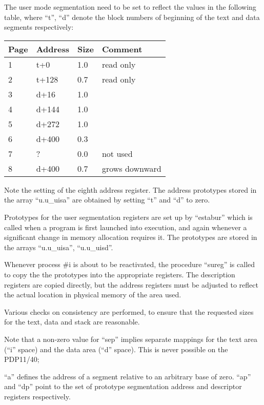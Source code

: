 The user mode segmentation need to be
set to reflect the values in the following table, where ``t'', ``d'' denote the
block numbers of beginning of the text
and data segments respectively:

\medskip

\begin{tabular}{llll}
{\bf Page}  & {\bf Address} & {\bf Size} & {\bf Comment} \\
\hline
1 & t+0    & 1.0 & read only \\
2 & t+128  & 0.7 & read only \\
3 & d+16   & 1.0 & \\
4 & d+144  & 1.0 & \\
5 & d+272  & 1.0 & \\
6 & d+400  & 0.3 & \\
7 & ?      & 0.0 & not used \\
8 & d+400  & 0.7 & grows downward \\
\end{tabular}

\medskip

Note the setting of the eighth address
register. The address prototypes stored
in the array ``u.u\_uisa'' are obtained by
setting ``t'' and ``d'' to zero.


Prototypes for the user segmentation
registers are set up by ``estabur'' which
is called when a program is first
launched into execution, and again
whenever a significant change in memory
allocation requires it. The prototypes
are stored in the arrays ``u.u\_uisa'',
``u.u\_uisd''.

Whenever process \#i is about to be reactivated, the procedure ``sureg'' is
called to copy the the prototypes into
the appropriate registers. The description registers are copied directly, but
the address registers must be adjusted
to reflect the actual location in physical memory of the area used.



\bd
\item[1654:] Various checks on consistency are
 performed, to ensure that the
 requested sizes for the text,
 data and stack are reasonable.

Note that a non-zero value for
``sep'' implies separate mappings
for the text area (``i'' space) and
the data area (``d'' space). This
is never possible on the
PDP11/40;

\item[1664:] ``a'' defines the address of a segment relative to an arbitrary
 base of zero. ``ap'' and ``dp'' point
 to the set of prototype segmentation address and descriptor
 registers respectively.
\ed


